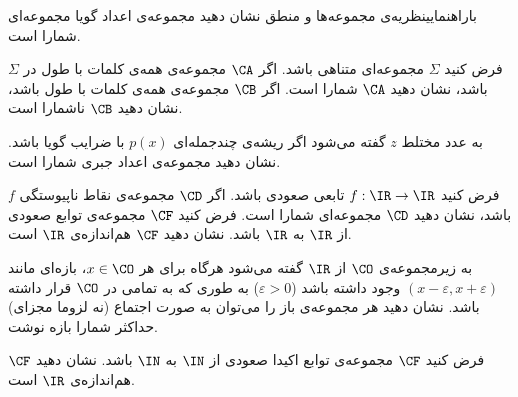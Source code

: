 ‌باراهنمایی{نظریه‌ی مجموعه‌ها و منطق}
نشان دهید مجموعه‌ی اعداد گویا مجموعه‌ای شمارا است.

فرض کنید $\Sigma$ مجموعه‌ای متناهی باشد.
 اگر $\CA$ مجموعه‌ی همه‌ی کلمات با طول  در $\Sigma$ باشد، نشان دهید $\CA$ شمارا است.
 اگر $\CB$ مجموعه‌ی همه‌ی کلمات با طول  باشد، نشان دهید $\CB$ ناشمارا است.

به عدد مختلط $z$  گفته می‌شود اگر ریشه‌ی چندجمله‌ای $p(x)$ با ضرایب گویا باشد. نشان دهید مجموعه‌ی اعداد جبری شمارا است.

فرض کنید
$f:\IR\to\IR$
تابعی صعودی باشد. اگر $\CD$ مجموعه‌ی نقاط ناپیوستگی $f$ باشد، نشان دهید $\CD$ مجموعه‌ای شمارا است.
فرض کنید $\CF$ مجموعه‌ی توابع صعودی از $\IR$ به $\IR$ باشد. نشان دهید $\CF$ هم‌اندازه‌ی $\IR$ است.

به زیرمجموعه‌ی $\CO$ از $\IR$  گفته می‌شود هرگاه برای هر $x\in\CO$، بازه‌ای مانند
$(x-\varepsilon,x+\varepsilon)$
وجود داشته باشد ($\varepsilon>0$) به طوری که به تمامی در $\CO$ قرار داشته باشد. نشان دهید هر مجموعه‌ی باز را می‌توان به صورت اجتماع (نه لزوما مجزای) حداکثر شمارا بازه نوشت.

فرض کنید $\CF$ مجموعه‌ی توابع اکیدا صعودی از $\IN$ به $\IN$ باشد. نشان دهید $\CF$ هم‌اندازه‌ی $\IR$ است.

